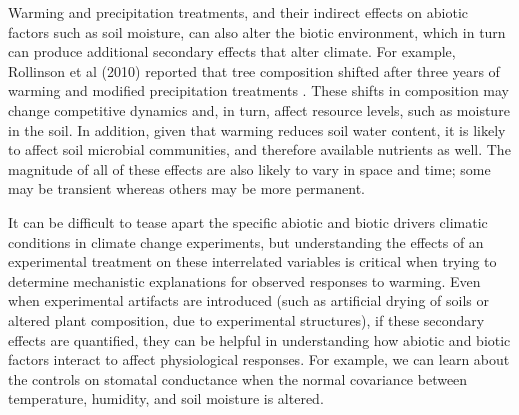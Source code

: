 \documentclass{article}
\begin{document}
\par Warming and precipitation treatments, and their indirect effects on abiotic factors such as soil moisture, can also alter the biotic environment, which in turn can produce additional secondary effects that alter climate. For example, Rollinson et al (2010) reported that tree composition shifted after three years of warming and modified precipitation treatments \citep{rollinson2012}. These shifts in composition may change competitive dynamics and, in turn, affect resource levels, such as moisture in the soil. In addition, given that warming reduces soil water content, it is likely to affect soil microbial communities, and therefore available nutrients as well. The magnitude of all of these effects are also likely to vary in space and time; some may be transient whereas others may be more permanent. 
\par It can be difficult to tease apart the specific abiotic and biotic drivers climatic conditions in climate change experiments, but understanding the effects of an experimental treatment on these interrelated variables is critical when trying to determine mechanistic explanations for observed responses to warming. Even when experimental artifacts are introduced (such as artificial drying of soils or altered plant composition, due to experimental structures), if these secondary effects are quantified, they can be helpful in understanding how abiotic and biotic factors interact to affect physiological responses. For example, we can learn about the controls on stomatal conductance when the normal covariance between temperature, humidity, and soil moisture is altered. 
\end{document}
